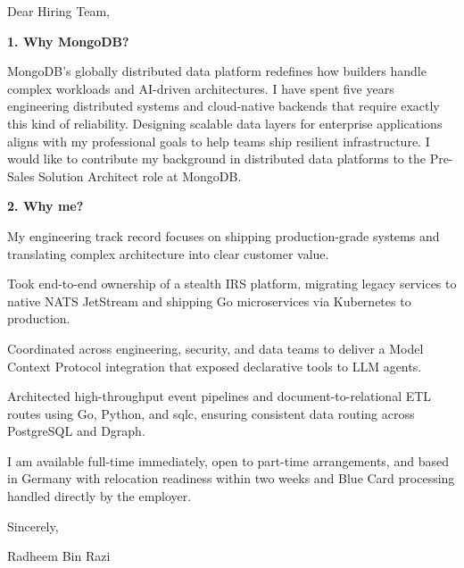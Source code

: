 \documentclass[11pt,a4paper]{coverletter}
\begin{document}

\opening{Dear Hiring Team,}

\vspace{8pt}\noindent\textbf{1. Why MongoDB?}\par\vspace{3pt}

MongoDB’s globally distributed data platform redefines how builders handle complex workloads and AI-driven architectures. I have spent five years engineering distributed systems and cloud-native backends that require exactly this kind of reliability. Designing scalable data layers for enterprise applications aligns with my professional goals to help teams ship resilient infrastructure. I would like to contribute my background in distributed data platforms to the Pre-Sales Solution Architect role at MongoDB.

\vspace{8pt}\noindent\textbf{2. Why me?}\par\vspace{3pt}

My engineering track record focuses on shipping production-grade systems and translating complex architecture into clear customer value.

\bullets

  \item Took end-to-end ownership of a stealth IRS platform, migrating legacy services to native NATS JetStream and shipping Go microservices via Kubernetes to production.

  \item Coordinated across engineering, security, and data teams to deliver a Model Context Protocol integration that exposed declarative tools to LLM agents.

  \item Architected high-throughput event pipelines and document-to-relational ETL routes using Go, Python, and sqlc, ensuring consistent data routing across PostgreSQL and Dgraph.

\bulletsend

I am available full-time immediately, open to part-time arrangements, and based in Germany with relocation readiness within two weeks and Blue Card processing handled directly by the employer.

\closing{Sincerely,}{Radheem Bin Razi}

\clearpage
{}

\end{document}
